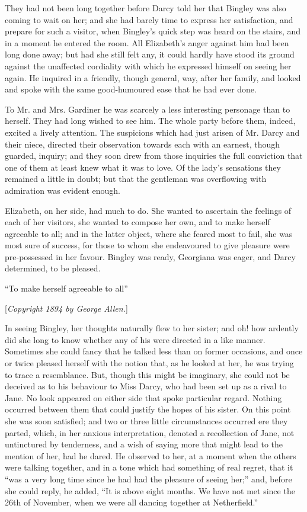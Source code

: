 \documentclass[12pt,openright]{book}
\begin{document}
They had not been long together before Darcy told her that Bingley was also coming to wait on her; and she had barely time to express her satisfaction, and prepare for such a visitor, when Bingley’s quick step was heard on the stairs, and in a moment he entered the room. All Elizabeth’s anger against him had been long done away; but had she still felt any, it could hardly have stood its ground against the unaffected cordiality with which he expressed himself on seeing her again. He inquired in a friendly, though general, way, after her family, and looked and spoke with the same good-humoured ease that he had ever done.

To Mr. and Mrs. Gardiner he was scarcely a less interesting personage than to herself. They had long wished to see him. The whole party before them, indeed, excited a lively attention. The suspicions which had just arisen of Mr. Darcy and their niece, directed their observation towards each with an earnest, though guarded, inquiry; and they soon drew from those inquiries the full conviction that one of them at least knew what it was to love. Of the lady’s sensations they remained a little in doubt; but that the gentleman was overflowing with admiration was evident enough.

Elizabeth, on her side, had much to do. She wanted to ascertain the feelings of each of her visitors, she wanted to compose her own, and to make herself agreeable to all; and in the latter object, where she feared most to fail, she was most sure of success, for those to whom she endeavoured to give pleasure were pre-possessed in her favour. Bingley was ready, Georgiana was eager, and Darcy determined, to be pleased.

“To make herself agreeable to all”

[\textit{Copyright 1894 by George Allen.}]

In seeing Bingley, her thoughts naturally flew to her sister; and oh! how ardently did she long to know whether any of his were directed in a like manner. Sometimes she could fancy that he talked less than on former occasions, and once or twice pleased herself with the notion that, as he looked at her, he was trying to trace a resemblance. But, though this might be imaginary, she could not be deceived as to his behaviour to Miss Darcy, who had been set up as a rival to Jane. No look appeared on either side that spoke particular regard. Nothing occurred between them that could justify the hopes of his sister. On this point she was soon satisfied; and two or three little circumstances occurred ere they parted, which, in her anxious interpretation, denoted a recollection of Jane, not untinctured by tenderness, and a wish of saying more that might lead to the mention of her, had he dared. He observed to her, at a moment when the others were talking together, and in a tone which had something of real regret, that it “was a very long time since he had had the pleasure of seeing her;” and, before she could reply, he added, “It is above eight months. We have not met since the 26th of November, when we were all dancing together at Netherfield.”
\end{document}
